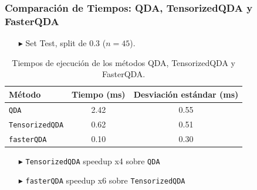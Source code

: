 \begin{frame}
  \frametitle{Comparación de Tiempos: QDA, TensorizedQDA y FasterQDA}

  \begin{itemize}
    \item[$\blacktriangleright$] Set Test, split de 0.3 ($n=45$).
  \end{itemize}

  \begin{table}[h!]
      \centering
      \begin{tabular}{@{}lcc@{}}
        \toprule
        \textbf{Método}      & Tiempo (ms)           & Desviación estándar (ms) \\ 
        \midrule
        \texttt{QDA}         & 2.42              & 0.55                 \\ 
        \texttt{TensorizedQDA} & 0.62            & 0.51                 \\ 
        \texttt{fasterQDA}   & 0.10              & 0.30                 \\ 
        \bottomrule
      \end{tabular}
      \caption{Tiempos de ejecución de los métodos QDA, TensorizedQDA y FasterQDA.}
  \end{table}


  \begin{itemize}
    \item[$\blacktriangleright$] \texttt{TensorizedQDA} speedup x4  sobre \texttt{QDA} 
    \item[$\blacktriangleright$] \texttt{fasterQDA} speedup x6  sobre \texttt{TensorizedQDA}
  \end{itemize}

\end{frame}


